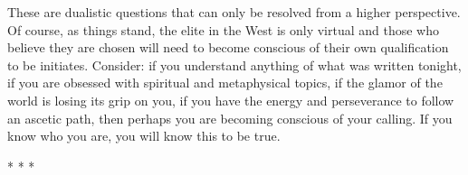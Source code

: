 These are dualistic questions that can only be resolved from a higher perspective. Of course, as things stand, the elite in the West is only virtual and those who believe they are chosen will need to become conscious of their own qualification to be initiates. Consider: if you understand anything of what was written tonight, if you are obsessed with spiritual and metaphysical topics, if the glamor of the world is losing its grip on you, if you have the energy and perseverance to follow an ascetic path, then perhaps you are becoming conscious of your calling. If you know who you are, you will know this to be true.




\begin{center}* * *\end{center}

